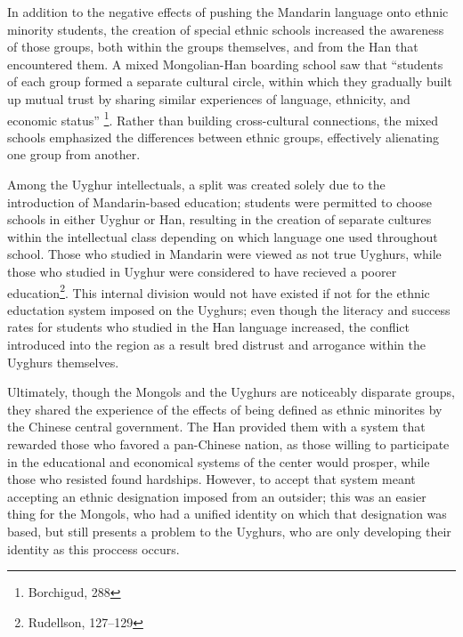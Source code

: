 In addition to the negative effects of pushing the Mandarin language onto
ethnic minority students, the creation of special ethnic schools increased the
awareness of those groups, both within the groups themselves, and from the Han
that encountered them. A mixed Mongolian-Han boarding school saw that
``students of each group formed a separate cultural circle, within which they
gradually built up mutual trust by sharing similar experiences of language,
ethnicity, and economic status'' \footnote{Borchigud, 288}. Rather than
building cross-cultural connections, the mixed schools emphasized the
differences between ethnic groups, effectively alienating one group from
another.

Among the Uyghur intellectuals, a split was created solely due to the
introduction of Mandarin-based education; students were permitted to choose
schools in either Uyghur or Han, resulting in the creation of separate cultures
within the intellectual class depending on which language one used throughout
school. Those who studied in Mandarin were viewed as not true Uyghurs, while
those who studied in Uyghur were considered to have recieved a poorer
education\footnote{Rudellson, 127--129}. This internal division would not have
existed if not for the ethnic eductation system imposed on the Uyghurs; even
though the literacy and success rates for students who studied in the Han
language increased, the conflict introduced into the region as a result bred
distrust and arrogance within the Uyghurs themselves.

Ultimately, though the Mongols and the Uyghurs are noticeably
disparate groups, they shared the experience of the effects of being defined as
ethnic minorites by the Chinese central government. The Han provided them with
a system that rewarded those who favored a pan-Chinese nation, as those willing
to participate in the educational and economical systems of the center would
prosper, while those who resisted found hardships. However, to accept that
system meant accepting an ethnic designation imposed from an outsider; this was
an easier thing for the Mongols, who had a unified identity on which that
designation was based, but still presents a problem to the Uyghurs, who are
only developing their identity as this proccess occurs.

